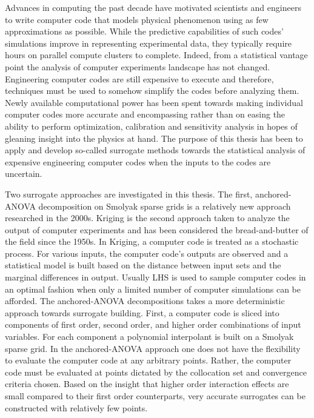 Advances in computing the past decade have motivated scientists and engineers to write computer code that models physical phenomenon using as few approximations as possible. While the predictive capabilities of such codes' simulations improve in representing experimental data, they typically require hours on parallel compute clusters to complete. Indeed, from a statistical vantage point the analysis of computer experiments landscape has not changed. Engineering computer codes are still expensive to execute and therefore, techniques must be used to somehow simplify the codes before analyzing them. Newly available computational power has been spent towards making individual computer codes more accurate and encompassing rather than on easing the ability to perform optimization, calibration and sensitivity analysis in hopes of gleaning insight into the physics at hand. The purpose of this thesis has been to apply and develop so-called surrogate methods towards the statistical analysis of expensive engineering computer codes when the inputs to the codes are uncertain. 

Two surrogate approaches are investigated in this thesis. The first, anchored-\ac{ANOVA} decomposition on Smolyak sparse grids is a relatively new approach researched in the 2000s. Kriging is the second approach taken to analyze the output of computer experiments and has been considered the bread-and-butter of the field since the 1950s. In Kriging, a computer code is treated as a stochastic process. For various inputs, the computer code's outputs are observed and a statistical model is built based on the distance between input sets and the marginal differences in output. Usually \ac{LHS} is used to sample computer codes in an optimal fashion when only a limited number of computer simulations can be afforded. The anchored-\ac{ANOVA} decompositions takes a more deterministic approach towards surrogate building. First, a computer code is sliced into components of first order, second order, and higher order combinations of input variables. For each component a polynomial interpolant is built on a Smolyak sparse grid. In the anchored-\ac{ANOVA} approach one does not have the flexibility to evaluate the computer code at any arbitrary points. Rather, the computer code must be evaluated at points dictated by the collocation set and convergence criteria chosen. Based on the insight that higher order interaction effects are small compared to their first order counterparts, very accurate surrogates can be constructed with relatively few points. 





  